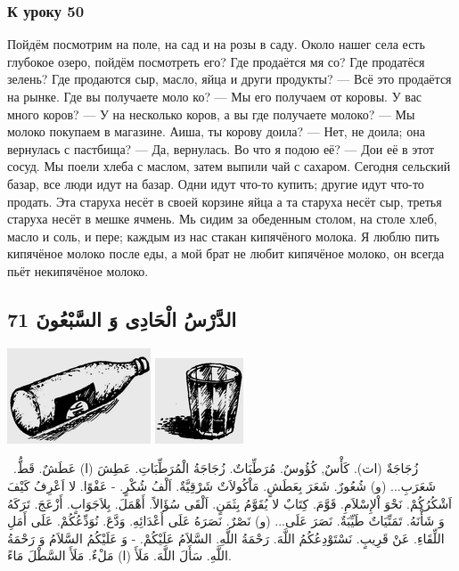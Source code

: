 \documentclass[a5paper]{article}
\begin{document}
\subsubsection{К уроку 50}
Пойдём посмотрим на поле, на сад и на розы в саду. Около нашег села есть глубокое озеро, пойдём посмотреть его? Где продаётся мя со? Где продатёся зелень? Где продаются сыр, масло, яйца и други продукты? — Всё это продаётся на рынке. Где вы получаете моло ко? — Мы его получаем от коровы. У вас много коров? — У на несколько коров, а вы где получаете молоко? — Мы молоко покупаем в магазине. Аиша, ты корову доила? — Нет, не доила; она вернулась с пастбища? — Да, вернулась. Во что я подою её? — Дои её в этот сосуд. Мы поели хлеба с маслом, затем выпили чай с сахаром. Сегодня сельский базар, все люди идут на базар. Одни идут что-то купить; другие идут что-то продать. Эта старуха несёт в своей корзине яйца а та старуха несёт сыр, третья старуха несёт в мешке ячмень. Мь сидим за обеденным столом, на столе хлеб, масло и соль, и пере; каждым из нас стакан кипячёного молока. Я люблю пить кипячёное молоко после еды, а мой брат не любит кипячёное молоко, он всегда пьёт некипячёное молоко.

\subsection{الدَّرْسُ الْحَادِى وَ السَّبْعُونَ 71}
 \includegraphics[width=1.6772in,height=1.1146in]{MuhammadBagauddinlatinized-img223.png}   \includegraphics[width=1.0311in,height=1in]{MuhammadBagauddinlatinized-img224.png} 

\ زُجَاجَةٌ (ات). كَأْسٌ, كُؤُوسٌ. مُرَطِّبَاتٌ. زُجَاجَةُ الْمُرَطِّبَاتِ. عَطِشَ (ا) عَطَشٌ. قَطُّ. \newline
شَعَرَبِ... (و) شُعُورٌ. شَعَرَ بِعَطَشٍ. مَاْكُولاَتٌ شَرْقِيَّةٌ. اَلْفُ شُكْرٍ. - عَفْوًا. لا اَعْرِفُ كَيْفَ اَشْكُرُكُمْ. نَحْوَ اْلإِسْلاَمِ. قَوَّمَ. كِتَابٌ لا يُقَوَّمُ بِثَمَنٍ. اَلْقَى سُؤَالاً. أَهْمَلَ. بِلاَجَوَابٍ. أَزْعَجَ. تَرَكَهُ وَ شَأْنَهُ. تَمَنِّيَاتٌ طَيِّبَةٌ. \newline
نَصَرَ عَلَى... (و) نَصْرٌ. نَصَرَهُ عَلَى أَعْدَائِهِ. وَدَّعَ. نُوَدِّعُكُمْ. عَلَى أَمَلِ اللِّقَاءِ. عَنْ قَرِيبٍ. نَسْتَوْدِعُكُمُ اللَّهَ. رَحْمَةُ اللَّهِ. السَّلاَمُ عَلَيْكُمْ. - وَ عَلَيْكُمُ السَّلاَمُ وَ رَحْمَةُ اللَّهِ. سَأَلَ اللَّهَ. مَلَأَ (ا) مَلْءٌ. مَلَأَ السَّطْلَ مَاءً.
\end{document}
